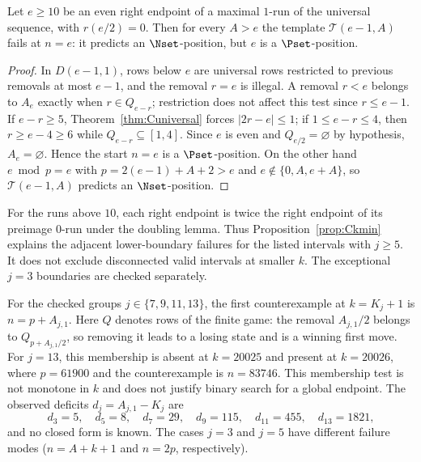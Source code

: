 \begin{proposition}\label{prop:Ckmin}
Let $e\ge10$ be an even right endpoint of a maximal $1$-run of the universal sequence, with $r(e/2)=0$. Then for every $A>e$ the template $\mathcal{T}(e-1,A)$ fails at $n=e$: it predicts an $\Nset$-position, but $e$ is a $\Pset$-position.
\end{proposition}
\begin{proof}
In $D(e-1,1)$, rows below $e$ are universal rows restricted to previous removals at most $e-1$, and the removal $r=e$ is illegal. A removal $r<e$ belongs to $A_e$ exactly when $r\in Q_{e-r}$; restriction does not affect this test since $r\le e-1$. If $e-r\ge5$, Theorem~\ref{thm:Cuniversal} forces $|2r-e|\le1$; if $1\le e-r\le4$, then $r\ge e-4\ge6$ while $Q_{e-r}\subseteq[1,4]$. Since $e$ is even and $Q_{e/2}=\varnothing$ by hypothesis, $A_e=\varnothing$. Hence the start $n=e$ is a $\Pset$-position. On the other hand $e\bmod p=e$ with $p=2(e-1)+A+2>e$ and $e\notin\{0,A,e+A\}$, so $\mathcal{T}(e-1,A)$ predicts an $\Nset$-position.
\end{proof}

For the runs above $10$, each right endpoint is twice the right endpoint of its preimage $0$-run under the doubling lemma. Thus Proposition~\ref{prop:Ckmin} explains the adjacent lower-boundary failures for the listed intervals with $j\ge5$. It does not exclude disconnected valid intervals at smaller $k$. The exceptional $j=3$ boundaries are checked separately.

\begin{remark}\label{rem:Cupper}
For the checked groups $j\in\{7,9,11,13\}$, the first counterexample at $k=K_j+1$ is $n=p+A_{j,1}$. Here $Q$ denotes rows of the finite game: the removal $A_{j,1}/2$ belongs to $Q_{p+A_{j,1}/2}$, so removing it leads to a losing state and is a winning first move. For $j=13$, this membership is absent at $k=20025$ and present at $k=20026$, where $p=61900$ and the counterexample is $n=83746$. This membership test is not monotone in $k$ and does not justify binary search for a global endpoint. The observed deficits $d_j=A_{j,1}-K_j$ are
\[
d_3=5,\quad d_5=8,\quad d_7=29,\quad d_9=115,\quad d_{11}=455,\quad d_{13}=1821,
\]
and no closed form is known. The cases $j=3$ and $j=5$ have different failure modes ($n=A+k+1$ and $n=2p$, respectively).
\end{remark}

